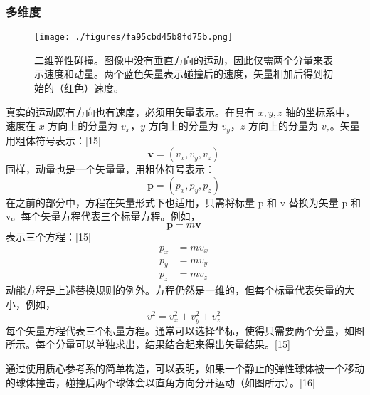 \subsubsection{多维度}
\begin{figure}[ht]
\centering
\texttt{[image: ./figures/fa95cbd45b8fd75b.png]}
\caption{二维弹性碰撞。图像中没有垂直方向的运动，因此仅需两个分量来表示速度和动量。两个蓝色矢量表示碰撞后的速度，矢量相加后得到初始的（红色）速度。} \label{fig_DL_3}
\end{figure}
真实的运动既有方向也有速度，必须用矢量表示。在具有 \(x,y,z\) 轴的坐标系中，速度在 \(x\) 方向上的分量为 \(v_x，y\) 方向上的分量为 \(v_y，z\) 方向上的分量为 \(v_z\)。矢量用粗体符号表示：[15]
\[
\mathbf{v} = (v_x, v_y, v_z)~
\]
同样，动量也是一个矢量量，用粗体符号表示：
\[
\mathbf{p} = (p_x, p_y, p_z)~
\]
在之前的部分中，方程在矢量形式下也适用，只需将标量 p 和 v 替换为矢量 p 和 v。每个矢量方程代表三个标量方程。例如，
\[
\mathbf{p} = m\mathbf{v}~
\]
表示三个方程：[15]
\[
\begin{aligned}
p_x &= mv_x \\
p_y &= mv_y \\
p_z &= mv_z
\end{aligned}~
\]
动能方程是上述替换规则的例外。方程仍然是一维的，但每个标量代表矢量的大小，例如，
\[
v^2 = v_x^2 + v_y^2 + v_z^2~
\]
每个矢量方程代表三个标量方程。通常可以选择坐标，使得只需要两个分量，如图所示。每个分量可以单独求出，结果结合起来得出矢量结果。[15]

通过使用质心参考系的简单构造，可以表明，如果一个静止的弹性球体被一个移动的球体撞击，碰撞后两个球体会以直角方向分开运动（如图所示）。[16]